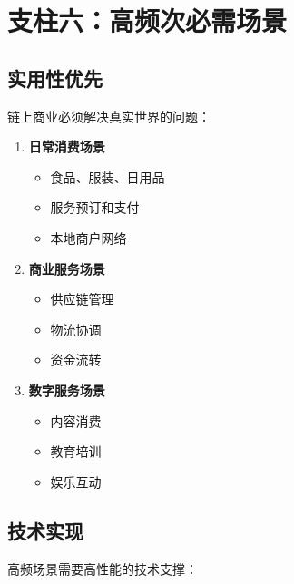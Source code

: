 \documentclass[
  Letterpaper,
]{scrbook}
\providecommand{\tightlist}{%
  \setlength{\itemsep}{0pt}\setlength{\parskip}{0pt}}
\begin{document}
\section{支柱六：高频次必需场景}\label{ux652fux67f1ux516dux9ad8ux9891ux6b21ux5fc5ux9700ux573aux666f}

\subsection{实用性优先}\label{ux5b9eux7528ux6027ux4f18ux5148}

链上商业必须解决真实世界的问题：

\begin{enumerate}
\def\labelenumi{\arabic{enumi}.}
\tightlist
\item
  \textbf{日常消费场景}

  \begin{itemize}
  \tightlist
  \item
    食品、服装、日用品
  \item
    服务预订和支付
  \item
    本地商户网络
  \end{itemize}
\item
  \textbf{商业服务场景}

  \begin{itemize}
  \tightlist
  \item
    供应链管理
  \item
    物流协调
  \item
    资金流转
  \end{itemize}
\item
  \textbf{数字服务场景}

  \begin{itemize}
  \tightlist
  \item
    内容消费
  \item
    教育培训
  \item
    娱乐互动
  \end{itemize}
\end{enumerate}

\subsection{技术实现}\label{ux6280ux672fux5b9eux73b0}

高频场景需要高性能的技术支撑：
\end{document}
